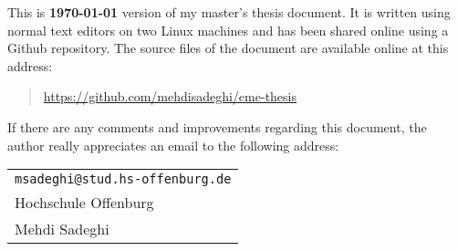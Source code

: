 This is \textbf{\today} version of my master's thesis document. It is written using 
normal text editors on two Linux machines and has been shared 
online using a Github repository. The source files of the document are available 
online at this address:

%
\begin{quote}
\url{https://github.com/mehdisadeghi/cme-thesis}
\end{quote}
%

If there are any comments and improvements regarding this document, the author really
appreciates an email to the following address:

\begin{center}
\begin{tabular}{l}
\nolinkurl{msadeghi@stud.hs-offenburg.de} \\
Hochschule Offenburg\\
Mehdi Sadeghi
\end{tabular}
\end{center}




